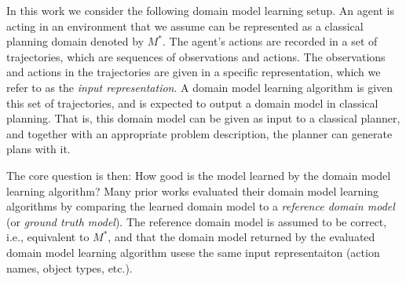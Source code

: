 \documentclass{article}
\theoremstyle{definition}
\theoremstyle{remark}
\newcommand{\realm}{{\ensuremath{M^*}}\xspace}
\newif\ifaddcomments
\newcommand{\roni}[1]{\ifaddcomments{\textcolor{red}{[Roni: #1]}}\fi}
\newcommand{\mauro}[1]{\ifaddcomments{\textcolor{green}{[Mauro: #1]}}\fi}
\newcommand{\gregor}[1]{\ifaddcomments{\textcolor{orange}{[Gregor: #1]}}\fi}
\begin{document}
In this work we consider the following domain model learning setup. 
An agent is acting in an environment that we assume can be represented as a classical planning domain denoted by $\realm$. 
The agent's actions are recorded in a set of trajectories, which are sequences of observations and actions. 
The observations and actions in the trajectories are given in a specific representation, which we refer to as the \emph{input representation}. 
A domain model learning algorithm is given this set of trajectories, and is expected to output a domain model in classical planning. 
That is, this domain model can be given as input to a classical planner, and together with an appropriate problem description, the planner can generate plans with it.
\gregor{Maybe add: These plans then should be applicable in the environment $\realm$ and should lead to the goal set in the problem description.}


The core question is then: How good is the model learned by the domain model learning algorithm?
Many prior works evaluated their domain model learning algorithms by comparing the learned domain model to a \emph{reference domain model} (or \emph{ground truth model}). 
The reference domain model is assumed to be correct, i.e., equivalent to \realm, 
and that the domain model returned by the evaluated domain model learning algorithm usese the same input representaiton (action names, object types, etc.). 
\end{document}
